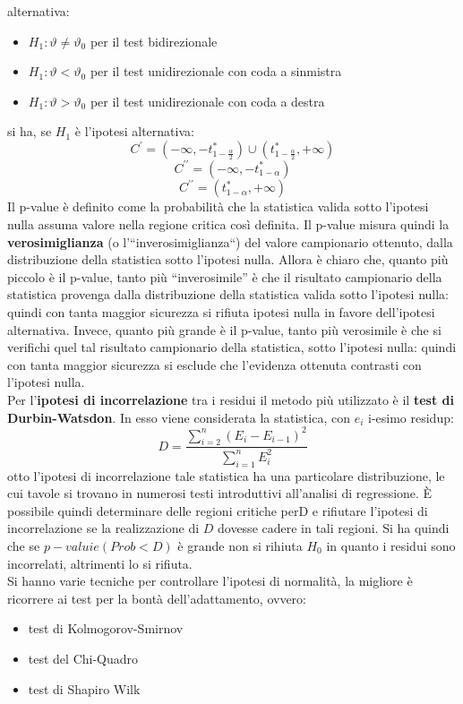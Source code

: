 \documentclass[a4paper,12pt, oneside]{book}
\begin{document}
alternativa:
\begin{itemize}
\item $H_{1} : \vartheta \neq \vartheta_{0}$ per il test bidirezionale
\item $H_{1} : \vartheta<\vartheta_{0}$ per il test unidirezionale con coda a sinmistra
\item $H_{1} : \vartheta>\vartheta_{0}$ per il test unidirezionale con coda a destra
\end{itemize}
si ha, se $H_1$ è l'ipotesi alternativa:
\[C^{\prime}=\left(-\infty,-t_{1-\frac{\alpha}{2}}^{*}\right) \cup\left(t_{1-\frac{\alpha}{2}}^{*},+\infty\right)\]
\[C^{\prime \prime}=\left(-\infty,-t_{1-\alpha}^{*}\right)\]
\[C^{\prime \prime}=\left(t_{1-\alpha}^{*},+\infty\right)\]
Il p-value è definito come la probabilità che la statistica valida sotto l'ipotesi nulla assuma
valore nella regione critica così definita.
Il p-value misura quindi la \textbf{verosimiglianza} (o l'“inverosimiglianza“) del valore
campionario ottenuto, dalla distribuzione della statistica sotto l'ipotesi nulla.
Allora è chiaro che, quanto più piccolo è il p-value, tanto più “inverosimile” è che il
risultato campionario della statistica provenga dalla distribuzione della statistica valida sotto
l'ipotesi nulla: quindi con tanta maggior sicurezza si rifiuta ipotesi nulla in favore
dell'ipotesi alternativa.
Invece, quanto più grande è il p-value, tanto più verosimile è che si verifichi quel tal
risultato campionario della statistica, sotto l'ipotesi nulla: quindi con tanta maggior
sicurezza si esclude che l'evidenza ottenuta contrasti con l'ipotesi nulla.\\
Per l'\textbf{ipotesi di incorrelazione} tra i residui il metodo più utilizzato è il \textbf{test di Durbin-Watsdon}. In esso viene considerata la statistica, con $e_i$ i-esimo residup:
\[D=\frac{\sum_{i=2}^{n}\left(E_{i}-E_{i-1}\right)^{2}}{\sum_{i=1}^{n} E_{i}^{2}}\]
otto l'ipotesi di incorrelazione tale statistica ha una particolare distribuzione, le cui
tavole si trovano in numerosi testi introduttivi all'analisi di regressione.
È possibile quindi determinare delle regioni critiche per$ $D e rifiutare l'ipotesi di
incorrelazione se la realizzazione di $D$ dovesse cadere in tali regioni. Si ha quindi che se $p-valuie(Prob<D)$ è grande non si rihiuta $H_0$ in quanto i residui sono incorrelati, altrimenti lo si rifiuta.
\\Si hanno varie tecniche per controllare l'ipotesi di normalità, la migliore è ricorrere ai test per la bontà dell'adattamento, ovvero:
\begin{itemize}
\item test di Kolmogorov-Smirnov
\item test del Chi-Quadro
\item test di Shapiro Wilk
\end{itemize}
\end{document}
